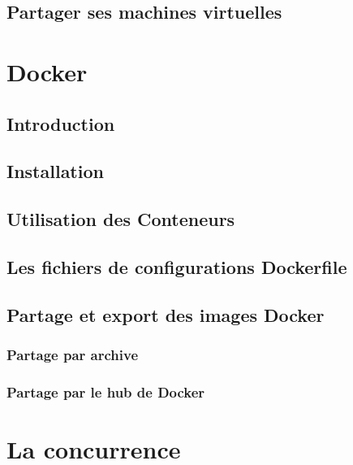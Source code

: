 \documentclass{beamer}
\begin{document}
    \subsection{Partager ses machines virtuelles}
    \begin{frame}
    \end{frame}

    
    \section{Docker}
    \subsection{Introduction}
    \begin{frame}
    \end{frame}

    \subsection{Installation}
    \begin{frame}
    \end{frame}

    \subsection{Utilisation des Conteneurs}
    \begin{frame}
    \end{frame}

    \subsection{Les fichiers de configurations Dockerfile}
    \begin{frame}
    \end{frame}

    \subsection{Partage et export des images Docker}
    \begin{frame}
    \end{frame}

    \subsubsection{Partage par archive}
    \begin{frame}
    \end{frame}

    \subsubsection{Partage par le hub de Docker}
    \begin{frame}
    \end{frame}


    \section{La concurrence}
\end{document}
